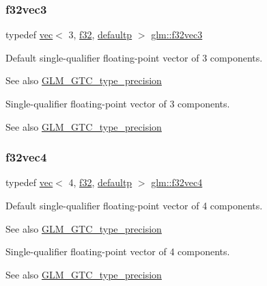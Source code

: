 \subsubsection{\texorpdfstring{f32vec3}{f32vec3}}
{\footnotesize\ttfamily typedef \hyperlink{structglm_1_1vec}{vec}$<$ 3, \hyperlink{group__gtc__type__precision_ga0ec999b57f5330d9021256e96038df04}{f32}, \hyperlink{namespaceglm_a36ed105b07c7746804d7fdc7cc90ff25a9d21ccd8b5a009ec7eb7677befc3bf51}{defaultp} $>$ \hyperlink{group__gtc__type__precision_ga4d08db2a75d1e8f85e0edbbd76f18ecf}{glm\+::f32vec3}}

Default single-\/qualifier floating-\/point vector of 3 components. \begin{DoxySeeAlso}{See also}
\hyperlink{group__gtc__type__precision}{G\+L\+M\+\_\+\+G\+T\+C\+\_\+type\+\_\+precision}
\end{DoxySeeAlso}
Single-\/qualifier floating-\/point vector of 3 components. \begin{DoxySeeAlso}{See also}
\hyperlink{group__gtc__type__precision}{G\+L\+M\+\_\+\+G\+T\+C\+\_\+type\+\_\+precision} 
\end{DoxySeeAlso}
\mbox{\label{group__gtc__type__precision_ga03e165a8b1ffe77625530fa335699e06}} 
\subsubsection{\texorpdfstring{f32vec4}{f32vec4}}
{\footnotesize\ttfamily typedef \hyperlink{structglm_1_1vec}{vec}$<$ 4, \hyperlink{group__gtc__type__precision_ga0ec999b57f5330d9021256e96038df04}{f32}, \hyperlink{namespaceglm_a36ed105b07c7746804d7fdc7cc90ff25a9d21ccd8b5a009ec7eb7677befc3bf51}{defaultp} $>$ \hyperlink{group__gtc__type__precision_ga03e165a8b1ffe77625530fa335699e06}{glm\+::f32vec4}}

Default single-\/qualifier floating-\/point vector of 4 components. \begin{DoxySeeAlso}{See also}
\hyperlink{group__gtc__type__precision}{G\+L\+M\+\_\+\+G\+T\+C\+\_\+type\+\_\+precision}
\end{DoxySeeAlso}
Single-\/qualifier floating-\/point vector of 4 components. \begin{DoxySeeAlso}{See also}
\hyperlink{group__gtc__type__precision}{G\+L\+M\+\_\+\+G\+T\+C\+\_\+type\+\_\+precision} 
\end{DoxySeeAlso}
\mbox{\label{group__gtc__type__precision_ga2bba392e555124b36cde6abba349bab3}} 
